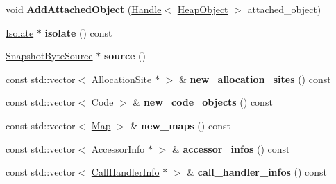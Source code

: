 \begin{DoxyCompactItemize}
void {\bfseries Add\+Attached\+Object} (\mbox{\hyperlink{classv8_1_1internal_1_1Handle}{Handle}}$<$ \mbox{\hyperlink{classv8_1_1internal_1_1HeapObject}{Heap\+Object}} $>$ attached\+\_\+object)
\item 
\mbox{\label{classv8_1_1internal_1_1Deserializer_ae09ee5548d1a9f0058991b3b267e0bbf}} 
\mbox{\hyperlink{classv8_1_1internal_1_1Isolate}{Isolate}} $\ast$ {\bfseries isolate} () const
\item 
\mbox{\label{classv8_1_1internal_1_1Deserializer_a8ed322dd624bc6248909742c244daca3}} 
\mbox{\hyperlink{classv8_1_1internal_1_1SnapshotByteSource}{Snapshot\+Byte\+Source}} $\ast$ {\bfseries source} ()
\item 
\mbox{\label{classv8_1_1internal_1_1Deserializer_a80bb6b1dc425702d88d3b65d9e61af4f}} 
const std\+::vector$<$ \mbox{\hyperlink{classv8_1_1internal_1_1AllocationSite}{Allocation\+Site}} $\ast$ $>$ \& {\bfseries new\+\_\+allocation\+\_\+sites} () const
\item 
\mbox{\label{classv8_1_1internal_1_1Deserializer_a067fbe5da0f7d5e5e4ad9cc4264f77fd}} 
const std\+::vector$<$ \mbox{\hyperlink{classv8_1_1internal_1_1Code}{Code}} $>$ \& {\bfseries new\+\_\+code\+\_\+objects} () const
\item 
\mbox{\label{classv8_1_1internal_1_1Deserializer_a7fb67a5fc9f74bd05d66c47be6a58d6d}} 
const std\+::vector$<$ \mbox{\hyperlink{classv8_1_1internal_1_1Map}{Map}} $>$ \& {\bfseries new\+\_\+maps} () const
\item 
\mbox{\label{classv8_1_1internal_1_1Deserializer_a6905aa08c09a9463c04d1388167f5860}} 
const std\+::vector$<$ \mbox{\hyperlink{classv8_1_1internal_1_1AccessorInfo}{Accessor\+Info}} $\ast$ $>$ \& {\bfseries accessor\+\_\+infos} () const
\item 
\mbox{\label{classv8_1_1internal_1_1Deserializer_af8ceb949b6fe5c3e2759059b789512dc}} 
const std\+::vector$<$ \mbox{\hyperlink{classv8_1_1internal_1_1CallHandlerInfo}{Call\+Handler\+Info}} $\ast$ $>$ \& {\bfseries call\+\_\+handler\+\_\+infos} () const

\end{DoxyCompactItemize}

